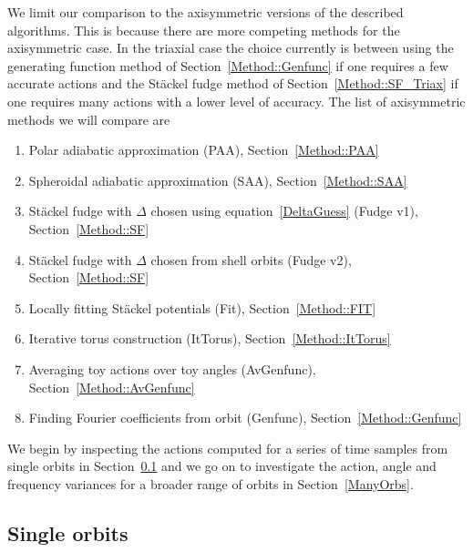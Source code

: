 \documentclass[useAMS,usenatbib,fleqn,a4paper]{mn2e}
\begin{document}
We limit our comparison to the axisymmetric versions of the described algorithms. This is because there are more competing methods for the axisymmetric case. In the triaxial case the choice currently is between using the generating function method of Section~\ref{Method::Genfunc} if one requires a few accurate actions and the St\"ackel fudge method of Section~\ref{Method::SF_Triax} if one requires many actions with a lower level of accuracy. The list of axisymmetric methods we will compare are
\begin{enumerate}
\item Polar adiabatic approximation (PAA), Section~\ref{Method::PAA}
\item Spheroidal adiabatic approximation (SAA), Section~\ref{Method::SAA}
\item St\"ackel fudge with $\Delta$ chosen using equation~\eqref{DeltaGuess} (Fudge v1), Section~\ref{Method::SF}
\item St\"ackel fudge with $\Delta$ chosen from shell orbits (Fudge v2), Section~\ref{Method::SF}
\item Locally fitting St\"ackel potentials (Fit), Section~\ref{Method::FIT}
\item Iterative torus construction (ItTorus), Section~\ref{Method::ItTorus}
\item Averaging toy actions over toy angles (AvGenfunc), Section~\ref{Method::AvGenfunc}
\item Finding Fourier coefficients from orbit (Genfunc), Section~\ref{Method::Genfunc}
\end{enumerate}
We begin by inspecting the actions computed for a series of time samples from single orbits in Section~\ref{SingleOrbs} and we go on to investigate the action, angle and frequency variances for a broader range of orbits in Section~\ref{ManyOrbs}.

\subsection{Single orbits}\label{SingleOrbs}
\end{document}
